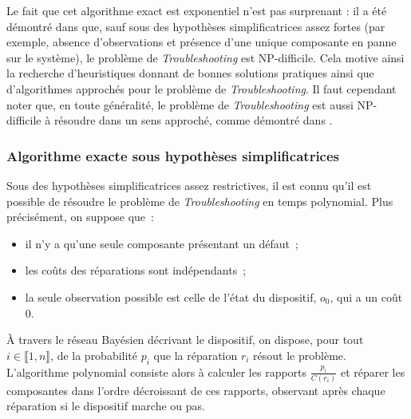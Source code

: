 \documentclass[a4paper,11pt]{article}
\theoremstyle{plain}
\theoremstyle{definition}
\begin{document}
Le fait que cet algorithme exact est exponentiel n'est pas surprenant : il a été démontré dans \cite{Vomlelov__2003} que, sauf sous des hypothèses simplificatrices assez fortes (par exemple, absence d'observations et présence d'une unique composante en panne sur le système), le problème de \emph{Troubleshooting} est NP-difficile. Cela motive ainsi la recherche d'heuristiques donnant de bonnes solutions pratiques ainsi que d'algorithmes approchés pour le problème de \emph{Troubleshooting}. Il faut cependant noter que, en toute généralité, le problème de \emph{Troubleshooting} est aussi NP-difficile à résoudre dans un sens approché, comme démontré dans \cite{L_n_2014}.

\subsubsection{Algorithme exacte sous hypothèses simplificatrices}
\label{SecAlgoSimple}

Sous des hypothèses simplificatrices assez restrictives, il est connu \cite{heckerman1994troubleshooting, Heckerman_1995, Vomlelov__2003, L_n_2014} qu'il est possible de résoudre le problème de \emph{Troubleshooting} en temps polynomial. Plus précisément, on suppose que~:
\begin{itemize}
\item il n'y a qu'une seule composante présentant un défaut~;
\item les coûts des réparations sont indépendants~; 
\item la seule observation possible est celle de l'état du dispositif, $o_0$, qui a un coût $0$.
\end{itemize}
À travers le réseau Bayésien décrivant le dispositif, on dispose, pour tout $i \in \llbracket 1, n\rrbracket$, de la probabilité $p_i$ que la réparation $r_i$ résout le problème. L'algorithme polynomial consiste alors à calculer les rapports $\frac{p_i}{C(r_i)}$ et réparer les composantes dans l'ordre décroissant de ces rapports, observant après chaque réparation si le dispositif marche ou pas.

\end{document}
